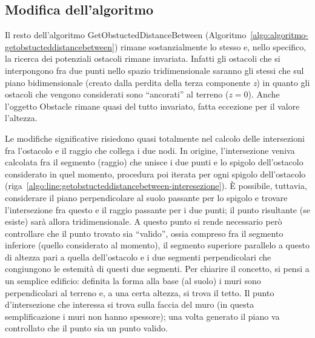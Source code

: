 \subsection{Modifica dell'algoritmo}\label{subsec:modifica-all-algoritmo}
Il resto dell'algoritmo \textsf{GetObstuctedDistanceBetween} (Algoritmo~\ref{algo:algoritmo-getobstucteddistancebetween})
rimane sostanzialmente lo stesso e, nello specifico, la ricerca dei potenziali ostacoli rimane invariata.
Infatti gli ostacoli che si interpongono fra due punti nello spazio tridimensionale saranno gli stessi che sul piano bidimensionale
(creato dalla perdita della terza componente \textit{z}) in quanto gli ostacoli che vengono considerati sono ``ancorati'' al terreno ($z=0$).
Anche l'oggetto \textsf{Obstacle} rimane quasi del tutto invariato, fatta eccezione per il valore l'altezza.

Le modifiche significative risiedono quasi totalmente nel calcolo delle intersezioni fra l'ostacolo e il raggio che collega i due nodi.
In origine, l'intersezione veniva calcolata fra il segmento (raggio) che unisce i due punti e lo spigolo dell'ostacolo considerato in quel
momento, procedura poi iterata per ogni spigolo dell'ostacolo (riga~\ref{algo:line:getobstucteddistancebetween-interesezione}).
È possibile, tuttavia, considerare il piano perpendicolare al suolo passante per lo spigolo e trovare l'intersezione fra questo
e il raggio passante per i due punti; il punto risultante (se esiste) sarà allora tridimensionale.
A questo punto si rende necessario però controllare che il punto trovato sia ``valido'', ossia compreso fra il segmento inferiore
(quello considerato al momento), il segmento superiore parallelo a questo di altezza pari a quella dell'ostacolo e i due segmenti
perpendicolari che congiungono le estemità di questi due segmenti.
Per chiarire il concetto, si pensi a un semplice edificio: definita la forma alla base (al suolo) i muri sono perpendicolari
al terreno e, a una certa altezza, si trova il tetto.
Il punto d'intersezione che interessa si trova sulla faccia del muro (in questa semplificazione i muri non hanno spessore);
una volta generato il piano va controllato che il punto sia un punto valido.

